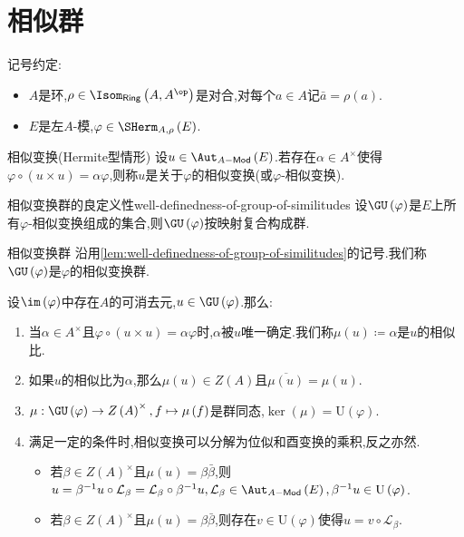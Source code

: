 \section{相似群}

记号约定:
\begin{itemize}
	\item $A$是环,$\rho\in\Isom_{\mathsf{Ring}}\left(A,A^{\op}\right)$是对合,对每个$a\in A$记$\bar{a}=\rho\left(a\right)$.
	\item $E$是左$A$-模,$\varphi\in\SHerm_{A,\rho}\left(E\right)$.
\end{itemize}

\begin{definition}{相似变换(Hermite型情形)}{}
	设$u\in\Aut_{A-\mathsf{Mod}}\left(E\right)$.若存在$\alpha\in A^{\times}$使得$\varphi\circ\left(u\times u\right)=\alpha\varphi$,则称$u$是关于$\varphi$的相似变换(或$\varphi$-相似变换).
\end{definition}

\begin{lemma}{相似变换群的良定义性}{well-definedness-of-group-of-similitudes}
	设$\GU\left(\varphi\right)$是$E$上所有$\varphi$-相似变换组成的集合,则$\GU\left(\varphi\right)$按映射复合构成群.
\end{lemma}

\begin{definition}{相似变换群}{}
	沿用\cref{lem:well-definedness-of-group-of-similitudes}的记号.我们称$\GU\left(\varphi\right)$是$\varphi$的相似变换群.
\end{definition}

\begin{remark}{}{}
	设$\im\left(\varphi\right)$中存在$A$的可消去元,$u\in\GU\left(\varphi\right)$.那么:
	\begin{enumerate}
		\item 当$\alpha\in A^{\times}$且$\varphi\circ\left(u\times u\right)=\alpha\varphi$时,$\alpha$被$u$唯一确定.我们称$\mu\left(u\right)\coloneq\alpha$是$u$的相似比.
		\item 如果$u$的相似比为$\alpha$,那么$\mu\left(u\right)\in Z\left(A\right)$且$\overline{\mu\left(u\right)}=\mu\left(u\right)$.
		\item $\mu:\GU\left(\varphi\right)\to Z\left(A\right)^{\times},f\mapsto\mu\left(f\right)$是群同态,$\ker\left(\mu\right)=\mathrm{U}\left(\varphi\right)$.
		\item 满足一定的条件时,相似变换可以分解为位似和酉变换的乘积,反之亦然.
		\begin{itemize}
			\item 若$\beta\in Z\left(A\right)^{\times}$且$\mu\left(u\right)=\beta\bar{\beta}$,则$u=\beta^{-1}u\circ\mathcal{L}_{\beta}=\mathcal{L}_{\beta}\circ\beta^{-1}u,\mathcal{L}_{\beta}\in\Aut_{A-\mathsf{Mod}}\left(E\right),\beta^{-1}u\in\mathrm{U}\left(\varphi\right)$.
			\item 若$\beta\in Z\left(A\right)^{\times}$且$\mu\left(u\right)=\beta\bar{\beta}$,则存在$v\in\mathrm{U}\left(\varphi\right)$使得$u=v\circ\mathcal{L}_{\beta}$.
		\end{itemize}
	\end{enumerate}
\end{remark}


